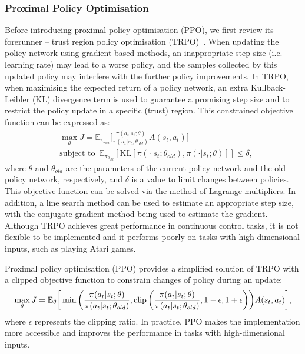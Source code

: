 \subsubsection{Proximal Policy Optimisation}
Before introducing proximal policy optimisation (PPO), we first review its forerunner -- trust region policy optimisation (TRPO)~\cite{schulman2015trust}. When updating the policy network using gradient-based methods, an inappropriate step size (i.e. learning rate) may lead to a worse policy, and the samples collected by this updated policy may interfere with the further policy improvements. In TRPO, when maximising the expected return of a policy network, an extra Kullback-Leibler (KL) divergence term is used to guarantee a promising step size and to restrict the policy update in a specific (trust) region. This constrained objective function can be expressed as:
\begin{align}
   & \max_{\theta} J = \mathbb{E}_{\pi_{\theta_{old}}}\biggr[\frac{\pi(a_{t}|s_{t};\theta)}{\pi(a_{t}|s_{t};\theta_{old})}A(s_{t},a_{t})\biggr] \\
   & \text{subject to} \enspace \mathbb{E}_{\pi_{\theta_{old}}}[\text{KL}[\pi(\cdot|s_{t};\theta_{old}), \pi(\cdot|s_{t};\theta)]] \leq \delta,
\end{align}
where $\theta$ and $\theta_{old}$ are the parameters of the current policy network and the old policy network, respectively, and $\delta$ is a value to limit changes between policies. This objective function can be solved via the method of Lagrange multipliers. In addition, a line search method can be used to estimate an appropriate step size, with the conjugate gradient method being used to estimate the gradient. Although TRPO achieves great performance in continuous control tasks, it is not flexible to be implemented and it performs poorly on tasks with high-dimensional inputs, such as playing Atari games.

Proximal policy optimisation (PPO) provides a simplified solution of TRPO with a clipped objective function to constrain changes of policy during an update:
\begin{equation}
\centering
\max_{\theta}J = \mathbb{E}_{\theta}\biggr[\min\bigg (\frac{\pi(a_{t}|s_{t};\theta)}{\pi(a_{t}|s_{t};\theta_{old})},
	\clip \bigg(\frac{\pi(a_{t}|s_{t};\theta)}{\pi(a_{t}|s_{t};\theta_{old})}, 1-\epsilon, 1+\epsilon \bigg)\bigg )A(s_t, a_t)\biggr],
\label{eq:standard_ppo}
\end{equation}
where $\epsilon$ represents the clipping ratio. In practice, PPO makes the implementation more accessible and improves the performance in tasks with high-dimensional inputs.

